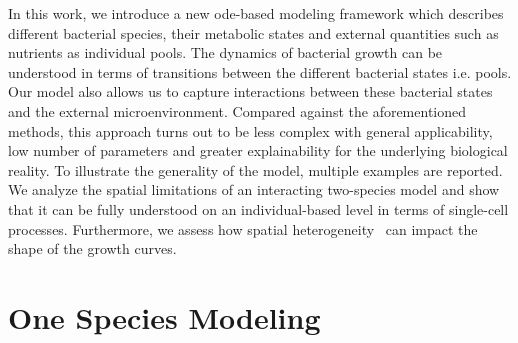 \documentclass[10pt,twocolumn,5p]{elsarticle}
\numberwithin{equation}{section}
\begin{document}

In this work, we introduce a new \ac{ode}-based modeling framework which describes different
bacterial species, their metabolic states and external quantities such as nutrients as individual
pools.
The dynamics of bacterial growth can be understood in terms of transitions between the different
bacterial states i.e. pools.
Our model also allows us to capture interactions between these bacterial states and the external
microenvironment.
Compared against the aforementioned methods, this approach turns out to be less complex with general
applicability, low number of parameters and greater explainability for the underlying biological
reality.
To illustrate the generality of the model, multiple examples are reported.
We analyze the spatial limitations of an interacting two-species model and show that it can be fully
understood on an individual-based level in terms of single-cell processes.
Furthermore, we assess how spatial heterogeneity~\cite{mckellar_heterogeneous_1997} can impact the shape of the growth curves.


\section{One Species Modeling}
\end{document}
